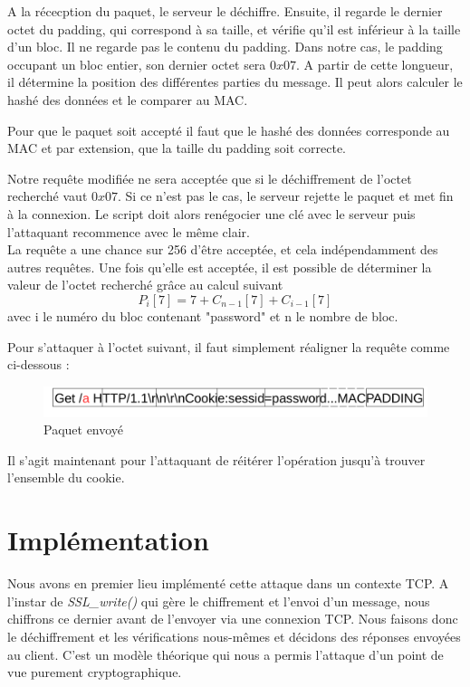  A la récecption du paquet, le serveur le déchiffre. Ensuite, il regarde le dernier octet du padding, qui correspond
à sa taille, et vérifie qu'il est inférieur à la taille d'un bloc. Il ne regarde pas le contenu du padding.
Dans notre cas, le padding occupant un bloc entier, son dernier octet sera $0x07$. A partir de cette longueur, 
il détermine la position des différentes parties du message. Il peut alors calculer le hashé des données et le comparer au MAC.

Pour que le paquet soit accepté il faut que le hashé des données corresponde au MAC et par extension, que la taille 
du padding soit correcte.

Notre requête modifiée ne sera acceptée que si le déchiffrement de l'octet recherché vaut $0x07$. Si ce n'est pas 
le cas, le serveur rejette le paquet et met fin à la connexion. Le script doit alors renégocier une clé avec le
serveur puis l'attaquant recommence avec le même clair.\\

 La requête a une chance sur 256 d'être acceptée, et cela indépendamment des autres requêtes. Une fois qu'elle est
acceptée, il est possible de déterminer la valeur de l'octet recherché grâce au calcul suivant
\[ P_i[7] = 7 + C_{n-1}[7] + C_{i-1}[7] \]
avec i le numéro du bloc contenant "password" et n le nombre de bloc.

Pour s'attaquer à l'octet suivant, il faut simplement réaligner la requête comme ci-dessous :

\begin{figure}[h]
\label{fig:packet2}
\centering
\includegraphics[scale=0.5]{Packet2}
\caption{Paquet envoyé}
\end{figure}

Il s'agit maintenant pour l'attaquant de réitérer l'opération jusqu'à trouver l'ensemble du cookie.

\section{Implémentation}
\label{sec:imp}

Nous avons en premier lieu implémenté cette attaque dans un contexte TCP. A l'instar de \emph{SSL\_write()} qui gère le 
chiffrement et l'envoi d'un message, nous chiffrons ce dernier avant de l'envoyer via une connexion TCP.
Nous faisons donc le déchiffrement et les vérifications nous-mêmes et décidons des réponses envoyées au client.
C'est un modèle théorique qui nous a permis l'attaque d'un point de vue purement cryptographique. \\


